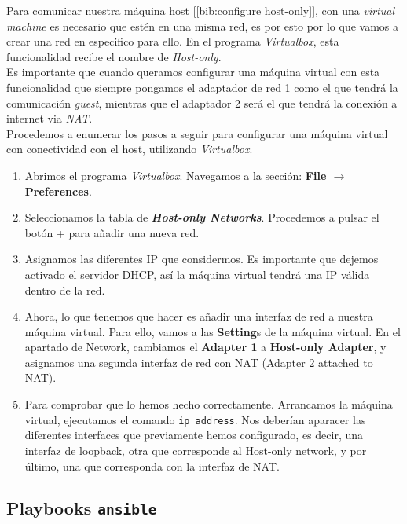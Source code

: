 \documentclass[12pt]{article}
\begin{document}
	\noindent Para comunicar nuestra máquina host [\ref{bib:configure host-only}], con una \textit{virtual machine} es necesario que estén en una misma red, es por esto por lo que vamos a crear una red en especifico para ello. En el programa \textit{Virtualbox}, esta funcionalidad recibe el nombre de \textit{Host-only}.\\
	
	\noindent Es importante que cuando queramos configurar una máquina virtual con esta funcionalidad que siempre pongamos el adaptador de red 1 como el que tendrá la comunicación \textit{guest}, mientras que el adaptador 2 será el que tendrá la conexión a internet via \textit{NAT}.\\
	
	\noindent Procedemos a enumerar los pasos a seguir para configurar una máquina virtual con conectividad con el host, utilizando \textit{Virtualbox}.
	
	\begin{enumerate}
		\item Abrimos el programa \textit{Virtualbox}. Navegamos a la sección: \textbf{File $\rightarrow$ Preferences}.
		\item Seleccionamos la tabla de \textbf{\textit{Host-only Networks}}. Procedemos a pulsar el botón + para añadir una nueva red.
		\item Asignamos las diferentes IP que considermos. Es importante que dejemos activado el servidor DHCP, así la máquina virtual tendrá una IP válida dentro de la red.
		\item Ahora, lo que tenemos que hacer es añadir una interfaz de red a nuestra máquina virtual. Para ello, vamos a las \textbf{Setting}s de la máquina virtual. En el apartado de Network, cambiamos el \textbf{Adapter 1} a\textbf{ Host-only Adapter}, y asignamos una segunda interfaz de red con NAT (Adapter 2 attached to NAT).
		\item Para comprobar que lo hemos hecho correctamente. Arrancamos la máquina virtual, ejecutamos el comando \texttt{ip address}. Nos deberían aparacer las diferentes interfaces que previamente hemos configurado, es decir, una interfaz de loopback, otra que corresponde al Host-only network, y por último, una que corresponda con la interfaz de NAT.
	\end{enumerate}
	
	\pagebreak
	
	\subsection{Playbooks \texttt{ansible}}
	
	\pagebreak
	
\end{document}
